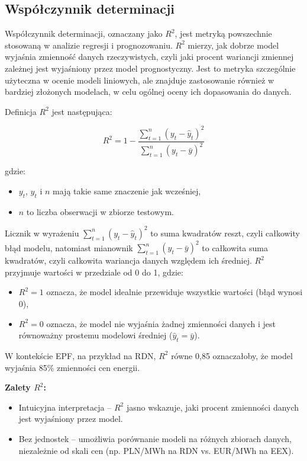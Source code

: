 \subsection{Współczynnik determinacji}
\label{subsec:r2}

Współczynnik determinacji, oznaczany jako \( R^2 \), jest metryką powszechnie stosowaną w analizie regresji i prognozowaniu. \( R^2 \) mierzy, jak dobrze model wyjaśnia zmienność danych rzeczywistych, czyli jaki procent wariancji zmiennej zależnej jest wyjaśniony przez model prognostyczny. Jest to metryka szczególnie użyteczna w ocenie modeli liniowych, ale znajduje zastosowanie również w bardziej złożonych modelach, w celu ogólnej oceny ich dopasowania do danych.

Definicja \( R^2 \) jest następująca:

\[
R^2 = 1 - \frac{\sum_{t=1}^{n} \left( y_t - \hat{y}_t \right)^2}{\sum_{t=1}^{n} \left( y_t - \bar{y} \right)^2}
\]

gdzie:
\begin{itemize}
    \item \( y_t \), \( \hat{y}_t \) i \( n \) mają takie same znaczenie jak wcześniej,
    \item \( n \) to liczba obserwacji w zbiorze testowym.
\end{itemize}

Licznik w wyrażeniu \( \sum_{t=1}^{n} \left( y_t - \hat{y}_t \right)^2 \) to suma kwadratów reszt, czyli całkowity błąd modelu, natomiast mianownik \( \sum_{t=1}^{n} \left( y_t - \bar{y} \right)^2 \) to całkowita suma kwadratów, czyli całkowita wariancja danych względem ich średniej. \( R^2 \) przyjmuje wartości w przedziale od 0 do 1, gdzie:
\begin{itemize}
    \item \( R^2 = 1 \) oznacza, że model idealnie przewiduje wszystkie wartości (błąd wynosi 0),
    \item \( R^2 = 0 \) oznacza, że model nie wyjaśnia żadnej zmienności danych i jest równoważny prostemu modelowi średniej (\( \hat{y}_t = \bar{y} \)).
\end{itemize}

W kontekście EPF, na przykład na RDN, \( R^2 \) równe 0,85 oznaczałoby, że model wyjaśnia 85\% zmienności cen energii.

\textbf{Zalety \( R^2 \):}
\begin{itemize}
    \item Intuicyjna interpretacja -- \( R^2 \) jasno wskazuje, jaki procent zmienności danych jest wyjaśniony przez model.
    \item Bez jednostek -- umożliwia porównanie modeli na różnych zbiorach danych, niezależnie od skali cen (np. PLN/MWh na RDN vs. EUR/MWh na EEX).
\end{itemize}

